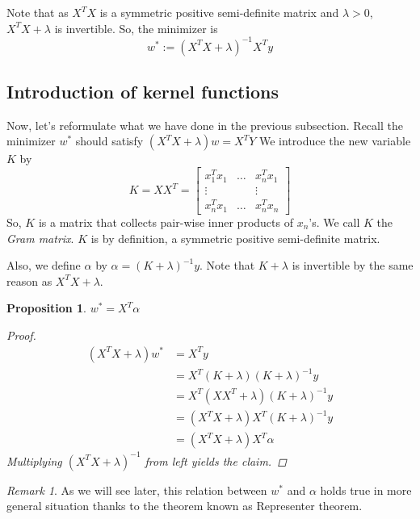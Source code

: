 \documentclass{amsart}
\newtheorem{proposition}[theorem]{Proposition}
\theoremstyle{definition}
\theoremstyle{remark}
\newtheorem{remark}[theorem]{Remark}
\numberwithin{equation}{section}
\begin{document}
Note that as $X^T X$ is a symmetric positive semi-definite matrix
and $\lambda > 0$, $X^TX+\lambda$ is invertible.
So, the minimizer is 
\begin{equation}
w^{\ast} := (X^TX+\lambda)^{-1}X^Ty
\end{equation}

\subsection{Introduction of kernel functions}

Now, let's reformulate what we have done in the previous subsection.
Recall the minimizer $w^{\ast}$ should satisfy $(X^TX+\lambda)w = X^T Y$
We introduce the new variable $K$ by
\[
K = XX^T =
\begin{bmatrix}
x_1^Tx_1 & \ldots & x_n^Tx_1 \\
\vdots & & \vdots \\
x_n^T x_1 & \ldots & x_n^T x_n
\end{bmatrix}
\]
So, $K$ is a matrix that collects pair-wise inner products of $x_n$'s.
We call $K$ the \textit{Gram matrix}.
$K$ is by definition, a symmetric positive semi-definite matrix.

Also, we define $\alpha$ by $\alpha = (K+\lambda)^{-1}y$.
Note that $K+\lambda$ is invertible by the same reason as $X^TX + \lambda$.

\begin{proposition}\label{w_min}
$w^{\ast} = X^T \alpha$
\begin{proof}
\begin{equation}
\begin{split}
(X^TX + \lambda)w^{\ast} &= X^Ty \\
                  &= X^T (K+\lambda) (K+\lambda)^{-1}y \\
                  &= X^T(XX^T+\lambda) (K+\lambda)^{-1}y \\
                  &= (X^TX + \lambda)X^T (K+\lambda)^{-1}y \\
                  &= (X^TX + \lambda)X^T \alpha
\end{split}
\end{equation}
Multiplying $(X^TX + \lambda)^{-1}$ from left yields the claim.
\end{proof}
\end{proposition}

\begin{remark}
As we will see later, this relation between $w^{\ast}$ and $\alpha$ holds true in more general situation
thanks to the theorem known as Representer theorem.
\end{remark}
\end{document}
